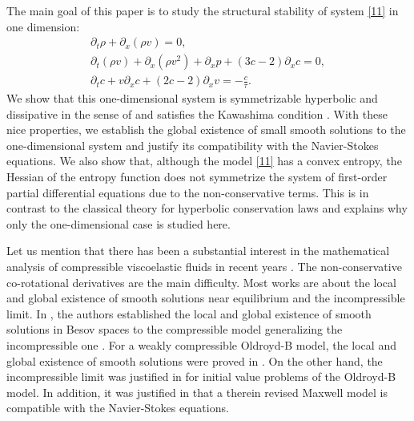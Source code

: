 \documentclass{article}
\theoremstyle{plain}
\begin{document}
The main goal of this paper is to study the structural stability of system \eqref{11} in one dimension:
\begin{subequations}\label{12}
  \begin{align}
  \partial_t \rho + \partial_x (\rho v) = 0 , \\
\partial_t (\rho v) + \partial_x (\rho v^2) + \partial_x p + (3c-2) \partial_x c = 0, \\
\partial_t c + v \partial_x c + (2c-2) \partial_x v =-\frac{c}{\tau}.
\end{align}
\end{subequations}
We show that this one-dimensional system is symmetrizable hyperbolic \cite{friedrichs1954symmetric} and dissipative in the sense of \cite{yong1992singular,yong1999singular} and satisfies the Kawashima condition \cite{kawashima1985systems}. With these nice properties,
we establish the global existence of small smooth solutions to the one-dimensional system and justify its compatibility with the Navier-Stokes equations.
We also show that, although the model \eqref{11} has a convex entropy, the Hessian of the entropy function does not symmetrize the system of
first-order partial differential equations due to the non-conservative terms. This is in contrast to the classical theory for hyperbolic conservation laws \cite{friedrichs1971systems} and explains why only the one-dimensional case is studied here.

Let us mention that there has been a substantial interest in the mathematical analysis of compressible viscoelastic fluids in recent years \cite{lei2006global,fang2014incompressible,hu2011global,qian2010global,hu2013global,hu2010local,qian2011initial, yong2014newtonian,guillope2010regular}. The non-conservative co-rotational derivatives
are the main difficulty. Most works are about the local and global existence of smooth solutions near equilibrium and the incompressible limit. In \cite{qian2010global,hu2011global, qian2011initial}, the authors established the local and global existence of smooth solutions in Besov spaces to the compressible model generalizing the incompressible one \cite{lin2005hydrodynamics}.
For a weakly compressible Oldroyd-B model, the local and global existence of smooth solutions were proved in \cite{guillope2010regular}.
On the other hand, the incompressible limit was justified in \cite{lei2006global,fang2014incompressible} for initial value problems of the Oldroyd-B model.
In addition, it was justified in \cite{yong2014newtonian} that a therein revised Maxwell model is compatible with the Navier-Stokes equations.
\end{document}
